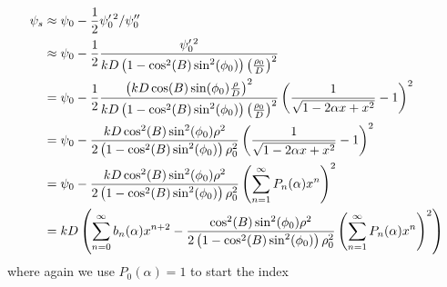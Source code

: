 \documentclass{article}
\theoremstyle{plain}
\begin{document}
        \begin{subequations}
            \begin{align}
                \psi_{s}
                &\approx\psi_{0}-
                    \frac{1}{2}\psi^{\prime\,2}_{0}/\psi^{\prime\prime}_{0}\\
                &\approx
                \psi_{0}-\frac{1}{2}
                \frac{\psi^{\prime\,2}_{0}}{%
                    kD\left(1-\cos^{2}(B)\sin^{2}(\phi_{0})\right)
                    \left(\frac{\rho_{0}}{D}\right)^{2}
                }\\
                &=\psi_{0}-\frac{1}{2}
                    \frac{%
                        \left(
                            kD\cos(B)\sin(\phi_{0})\frac{\rho}{D}
                        \right)^{2}
                    }{%
                        kD\left(1-\cos^{2}(B)\sin^{2}(\phi_{0})\right)
                        \left(\frac{\rho_{0}}{D}\right)^{2}
                    }\left(
                        \frac{1}{\sqrt{1-2\alpha{x}+x^{2}}}-1
                    \right)^{2}\\
                &=\psi_{0}-
                    \frac{%
                        kD\cos^{2}(B)\sin^{2}(\phi_{0})\rho^{2}%
                    }{%
                        2\left(
                            1-\cos^{2}(B)\sin^{2}(\phi_{0})
                        \right)\rho_{0}^{2}
                    }\left(
                        \frac{1}{\sqrt{1-2\alpha{x}+x^{2}}}-1
                    \right)^{2}\\
                &=\psi_{0}-
                    \frac{%
                        kD\cos^{2}(B)\sin^{2}(\phi_{0})\rho^{2}%
                    }{%
                        2\left(1-\cos^{2}(B)\sin^{2}(\phi_{0})\right)
                        \rho_{0}^{2}
                    }\left(
                        \sum_{n=1}^{\infty}P_{n}(\alpha)x^{n}
                    \right)^{2}\\
                &=kD\left(
                    \sum_{n=0}^{\infty}b_{n}(\alpha)x^{n+2}-
                    \frac{%
                        \cos^{2}(B)\sin^{2}(\phi_{0})\rho^{2}
                    }{%
                        2\left(1-\cos^{2}(B)\sin^{2}(\phi_{0})\right)
                        \rho_{0}^{2}
                    }\left(
                        \sum_{n=1}^{\infty}P_{n}(\alpha)x^{n}
                    \right)^{2}
                \right)
            \end{align}
        \end{subequations}
        where again we use $P_{0}(\alpha)=1$ to start the index
\end{document}

